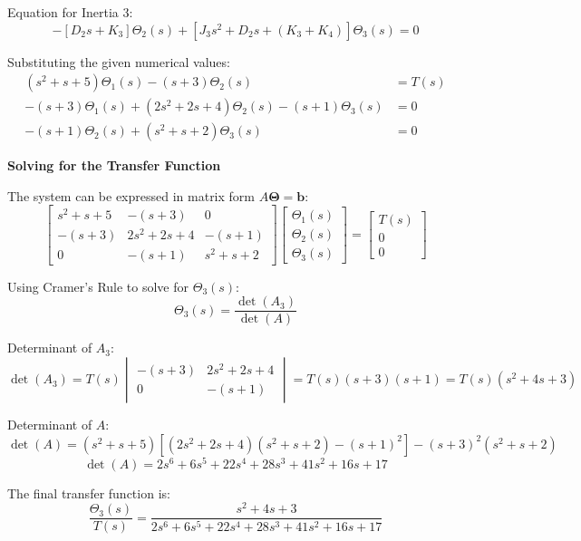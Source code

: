 \documentclass[11pt]{article}
\begin{document}
Equation for Inertia 3:
\[
-[D_2s + K_3]\Theta_2(s) + [J_3 s^2 + D_2s + (K_3 + K_4)]\Theta_3(s) = 0
\]

Substituting the given numerical values:
\begin{align}
    (s^2 + s + 5)\Theta_1(s) - (s + 3)\Theta_2(s) &= T(s) \tag{1} \\
    -(s + 3)\Theta_1(s) + (2s^2 + 2s + 4)\Theta_2(s) - (s + 1)\Theta_3(s) &= 0 \tag{2} \\
    -(s + 1)\Theta_2(s) + (s^2 + s + 2)\Theta_3(s) &= 0 \tag{3}
\end{align}

\noindent\textbf{Solving for the Transfer Function}
\vspace{8pt}

The system can be expressed in matrix form $A\boldsymbol{\Theta} = \mathbf{b}$:
$$ 
\begin{bmatrix} 
s^2 + s + 5 & -(s + 3) & 0 \\ 
-(s + 3) & 2s^2 + 2s + 4 & -(s + 1) \\ 
0 & -(s + 1) & s^2 + s + 2 
\end{bmatrix} 
\begin{bmatrix} 
\Theta_1(s) \\ \Theta_2(s) \\ \Theta_3(s) 
\end{bmatrix} 
= 
\begin{bmatrix} 
T(s) \\ 0 \\ 0 
\end{bmatrix} 
$$

Using Cramer's Rule to solve for $\Theta_3(s)$:
$$ \Theta_3(s) = \frac{\det(A_3)}{\det(A)} $$

Determinant of $A_3$:
$$ \det(A_3) = T(s) \begin{vmatrix} -(s + 3) & 2s^2 + 2s + 4 \\ 0 & -(s + 1) \end{vmatrix} = T(s)(s + 3)(s + 1) = T(s)(s^2 + 4s + 3) $$

Determinant of $A$:
$$ \det(A) = (s^2 + s + 5)[(2s^2 + 2s + 4)(s^2 + s + 2) - (s + 1)^2] - (s + 3)^2(s^2 + s + 2) $$
$$ \det(A) = 2s^6 + 6s^5 + 22s^4 + 28s^3 + 41s^2 + 16s + 17 $$

The final transfer function is:
\[ 
\boxed{ \frac{\Theta_3(s)}{T(s)} = \frac{s^2 + 4s + 3}{2s^6 + 6s^5 + 22s^4 + 28s^3 + 41s^2 + 16s + 17} } 
\]
\end{document}
